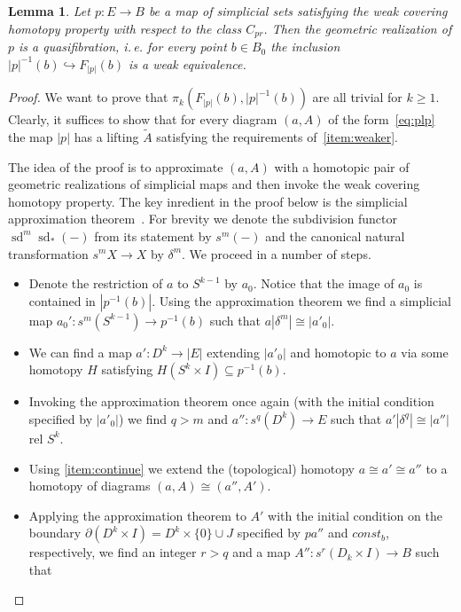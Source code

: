 \documentclass[oneside, 12pt]{amsart}
\theoremstyle{plain}
\numberwithin{equation}{section}
\newtheorem{lemma}{Lemma}
\numberwithin{lemma}{section}
\theoremstyle{remark}
\theoremstyle{definition}
\DeclareMathOperator{\sd}{sd}
\begin{document}
\begin{lemma} \label{lm:weak-equiv} Let $p\colon E \to B$ be a map of simplicial sets satisfying the weak covering homotopy property with respect to the class $C_{pr}$.
 Then the geometric realization of $p$ is a quasifibration, i.\,e. for every point $b \in B_0$ the inclusion $|p|^{-1}(b) \hookrightarrow F_{|p|}(b)$ is a weak equivalence. \end{lemma}
\begin{proof}

 We want to prove that $\pi_k(F_{|p|}(b), |p|^{-1}(b))$ are all trivial for $k \geq 1$.
 Clearly, it suffices to show that for every diagram $(a, A)$ of the form~\eqref{eq:plp} the map $|p|$ 
  has a lifting $\widetilde{A}$ satisfying the requirements of~\cref{item:weaker}.
 
 The idea of the proof is to approximate $(a, A)$ with a homotopic pair of geometric realizations of simplicial maps and then invoke the weak covering homotopy property. 
 The key inredient in the proof below is the simplicial approximation theorem~\cite[Theorem~4.7]{Jar04}.
 For brevity we denote the subdivision functor $\sd^m\sd_*(-)$ from its statement by $s^m(-)$ and the canonical natural transformation $s^m X \to X$ by $\delta^m$.
 We proceed in a number of steps.
 \begin{itemize}
  \item Denote the restriction of $a$ to $S^{k-1}$ by $a_0$.
   Notice that the image of $a_0$ is contained in $|p^{-1}(b)|$.
   Using the approximation theorem we find a simplicial map $a_0'\colon s^m (S^{k-1}) \to p^{-1}(b)$ such that $a|\delta^m| \cong |a'_0|$.     
  \item We can find a map $a'\colon D^k\to |E|$ extending $|a'_0|$ and homotopic to $a$ via some homotopy $H$ satisfying $H(S^k\times I) \subseteq p^{-1}(b)$.
  \item Invoking the approximation theorem once again (with the initial condition specified by $|a'_0|$) we find $q>m$ and $a''\colon s^{q}(D^k) \to E$
    such that $a'|\delta^{q}| \cong |a''|$ rel $S^k$.
  \item Using \cref{item:continue} we extend the (topological) homotopy $a \cong a' \cong a''$ to a homotopy of diagrams $(a, A) \cong (a'', A')$.
  \item Applying the approximation theorem to $A'$ with the initial condition on the boundary $\partial (D^k \times I) = D^k\times \{0\} \cup J$ specified by 
    $pa''$ and $const_b$, respectively, we find an integer $r>q$ and a map $A''\colon s^{r}(D_k \times I) \to B$ such that

\end{itemize}
\end{proof}
\end{document}

